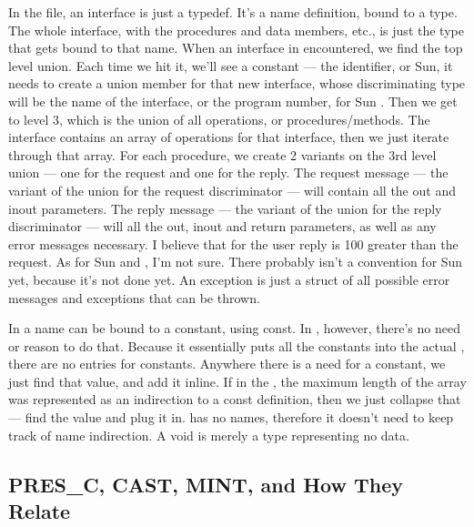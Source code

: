 In the \AOI{} file, an interface is just a typedef.  It's a name definition, bound
to a type.  The whole interface, with the procedures and data members, etc., is
just the type that gets bound to that name.  When an \AOI{} interface in
encountered, we find the top level union.  Each time we hit it, we'll see a
constant --- the \IDL{} identifier, \CORBA{} or Sun, it needs to create a union
member for that new interface, whose discriminating type will be the name of
the interface, or the program number, for Sun \IDL{}\@.  Then we get to level 3,
which is the union of all operations, or procedures/methods.  The \AOI{} interface
contains an array of operations for that interface, then we just iterate
through that array.  For each procedure, we create 2 variants on the 3rd level
union --- one for the request and one for the reply.  The request message ---
the variant of the union for the request discriminator --- will contain all the
out and inout parameters.  The reply message --- the variant of the union for
the reply discriminator --- will all the out, inout and return parameters, as
well as any error messages necessary.  I believe that for \MIG{} the user reply is
100 greater than the request.  As for Sun and \CORBA{}, I'm not sure.  There
probably isn't a convention for Sun yet, because it's not done yet.  An
exception is just a struct of all possible error messages and exceptions that
can be thrown.

In \AOI{} a name can be bound to a constant, using const.  In \MINT{}, however,
there's no need or reason to do that.  Because it essentially puts all the
constants into the actual \MINT{}, there are no entries for constants.  Anywhere
there is a need for a constant, we just find that value, and add it inline.  If
in the \AOI{}, the maximum length of the array was represented as an indirection
to a const definition, then we just collapse that --- find the value and plug
it in.  \MINT{} has no names, therefore it doesn't need to keep track of name
indirection.  A void is merely a type representing no data.


\subsection{PRES\_C, CAST, MINT, and How They Relate}

